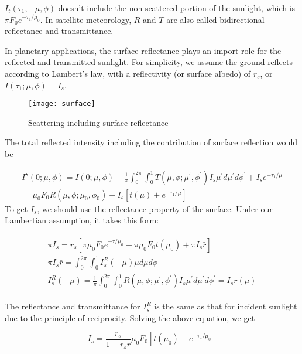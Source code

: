 \begin{appendices}
$I_t(\tau_1, -\mu, \phi)$ doesn't include the non-scattered portion of the sunlight, which is $\pi F_0 e^{-\tau_1/\mu_0}$. In satellite meteorology, $R$ and $T$ are also called bidirectional reflectance and transmittance.

In planetary applications, the surface reflectance plays an import role for the reflected and transmitted sunlight. For simplicity, we assume the ground reflects according to Lambert's law, with a reflectivity (or surface albedo) of $r_s$, or $I(\tau_1; \mu, \phi) = I_s$.

\begin{figure}[h!]
    \centering
    \texttt{[image: surface]}
    \caption{Scattering including surface reflectance}
\end{figure}

The total reflected intensity including the contribution of surface reflection would be

\begin{multline}
I^\star(0; \mu, \phi) = I(0; \mu, \phi) + \frac{1}{\pi} \int_{0}^{2\pi} \int_{0}^{1} T(\mu, \phi; \mu^\prime, \phi^\prime) I_s \mu^\prime d\mu^\prime d\phi^\prime + I_se^{-\tau_1/\mu} \\
= \mu_0F_0 R(\mu, \phi;\mu_0, \phi_0) + I_s\left[t(\mu) + e^{-\tau_1/\mu}\right]
\end{multline}
To get $I_s$, we should use the reflectance property of the surface. Under our Lambertian assumption, it takes this form:

\begin{align}
\begin{split}
    \pi I_s = r_s \left[ \pi \mu_0 F_0 e^{-\tau/\mu_0} + \pi \mu_0 F_0 t(\mu_0) + \pi I_s \bar{r} \right] \\
    \pi I_s \bar{r} = \int_{0}^{2\pi}\int_{0}^{1} I^R_s(-\mu)\mu d\mu d\phi \\
    I^R_s(-\mu) = \frac{1}{\pi} \int_{0}^{2\pi} \int_{0}^{1} R(\mu, \phi;\mu^\prime, \phi^\prime) I_s \mu^\prime d\mu^\prime d\phi^\prime = I_s r(\mu)
\end{split}
\end{align}

The reflectance and transmittance for $I_s^R$ is the same as that for incident sunlight due to the principle of reciprocity. Solving the above equation, we get

\begin{equation}
    I_s = \frac{r_s}{1-r_s\bar{r}} \mu_0 F_0 \left[ t(\mu_0) + e^{-\tau_1/\mu_0} \right]
\end{equation}


\end{appendices}
